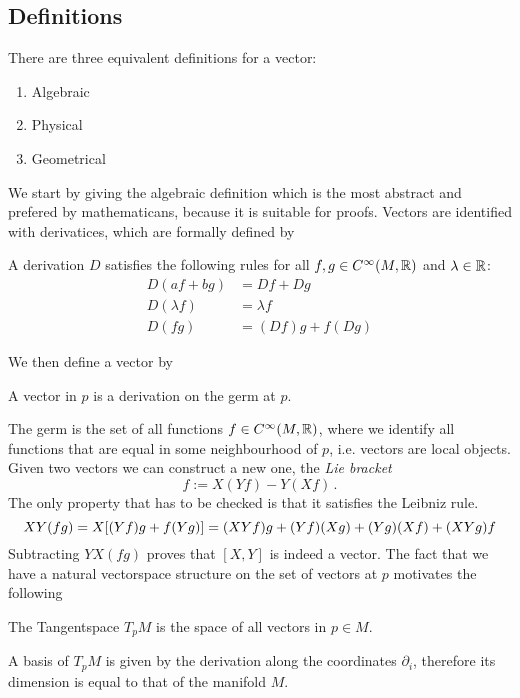 \subsection{Definitions}
There are three equivalent definitions for a
vector:
\begin{enumerate}
    \item Algebraic 
    \item Physical
    \item Geometrical 
\end{enumerate}
We start by giving the algebraic definition which is the most
abstract and prefered by mathematicans, because it is suitable for proofs.
Vectors are identified with derivatices, which are formally defined by
\begin{definition}[Derivation]
A derivation $D$ satisfies the following rules for all $f,g\in
C^\infty(M,\mathbb{R})$ and $\lambda \in \mathbb{R}$:
\begin{align}
    D(af+bg) &=Df+Dg\\
    D(\lambda f)&=\lambda f\\
    D(fg)&= (Df)g+f(Dg)
\end{align}
\end{definition}
We then define a vector by 
\begin{definition} A vector in $p$ is a derivation on the germ at $p$.
\end{definition}
The germ is the set of all functions $f\in C^\infty(M,\mathbb{R})$, where we
identify all functions that are equal in some neighbourhood of $p$, i.e. vectors are local objects.
Given two vectors we can construct a new one, the \emph{Lie bracket}
\begin{equation}
    [X,Y]f:=X(Yf)-Y(Xf)\, .
\end{equation}
The only property that has to be checked is that it satisfies the Leibniz rule.
\begin{equation}
    XY(fg)=X[(Yf)g+f(Yg)]=(XYf)g+(Yf)(Xg)+(Yg)(Xf)+(XYg)f\\
\end{equation}
Subtracting $YX(fg)$ proves that $[X,Y]$ is indeed a vector. The fact that we
have a natural vectorspace structure on the set of vectors at $p$ motivates the
following
\begin{definition}
The Tangentspace $T_pM$ is the space of all vectors in $p\in M$.
\end{definition}
A basis of $T_pM$ is given by the derivation along the
coordinates $\partial_i$, therefore its dimension is equal to that of the manifold $M$.
